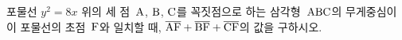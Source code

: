 포물선 $y^2=8x$ 위의 세 점~$\mathrm{A}$, $\mathrm{B}$, $\mathrm{C}$를 꼭짓점으로 하는 삼각형~$\mathrm{ABC}$의 무게중심이 이 포물선의 초점~$\mathrm{F}$와 일치할 때, $\overline{\mathrm{AF}}+\overline{\mathrm{BF}}+\overline{\mathrm{CF}}$의 값을 구하시오.
